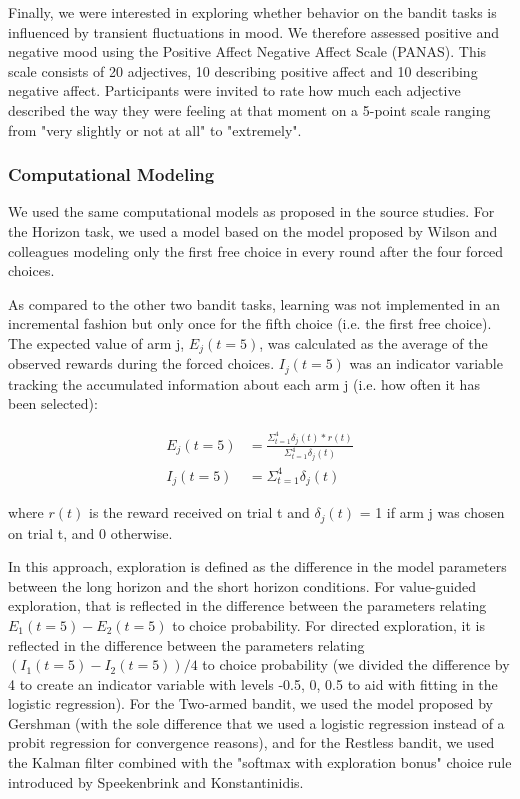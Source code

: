\documentclass[fleqn,10pt]{wlscirep}
\begin{document}
Finally, we were interested in exploring whether behavior on the bandit tasks is influenced by transient fluctuations in mood. We therefore assessed positive and negative mood using the Positive Affect Negative Affect Scale (PANAS)\cite{watson1988development}. This scale consists of 20 adjectives, 10 describing positive affect and 10 describing negative affect. Participants were invited to rate how much each adjective described the way they were feeling at that moment on a 5-point scale ranging from "very slightly or not at all" to "extremely".

\subsubsection*{Computational Modeling}
We used the same computational models as proposed in the source studies. For the Horizon task, we used a model based on the model proposed by Wilson and colleagues\cite{wilson_humans_2014} modeling only the first free choice in every round after the four forced choices. 

As compared to the other two bandit tasks, learning was not implemented in an incremental fashion but only once for the fifth choice (i.e. the first free choice). The expected value of arm j, $E_j(t=5)$, was calculated as the average of the observed rewards during the forced choices. $I_j(t=5)$ was  an indicator variable tracking the accumulated information about each arm j (i.e. how often it has been selected):

\begin{align}
    E_j(t=5) &= \frac{\Sigma_{t = 1}^4 \delta_j(t) * r(t)}{\Sigma_{t=1}^4 \delta_j(t)} \\
    I_j(t=5) &= \Sigma_{t=1}^4 \delta_j(t)
\end{align}

where $r(t)$ is the reward received on trial t and $\delta_j(t)$ = 1 if arm j was chosen on trial t, and 0 otherwise.

In this approach, exploration is defined as the difference in the model parameters between the long horizon and the short horizon conditions. For value-guided exploration, that is reflected in the difference between the parameters relating $E_1(t=5) - E_2(t=5)$ to choice probability. For directed exploration, it is reflected in the difference between the parameters relating $(I_1(t=5) - I_2(t=5))/4$ to choice probability (we divided the difference by 4 to create an indicator variable with levels -0.5, 0, 0.5 to aid with fitting in the logistic regression). For the Two-armed bandit, we used the model proposed by Gershman\cite{gershman_deconstructing_2018} (with the sole difference that we used a logistic regression instead of a probit regression for convergence reasons), and for the Restless bandit, we used the Kalman filter combined with the "softmax with exploration bonus" choice rule introduced by Speekenbrink and Konstantinidis\cite{speekenbrink_uncertainty_2015}.
\end{document}

